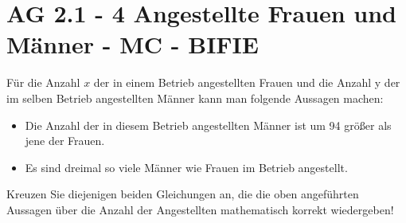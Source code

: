 \section{AG 2.1 - 4 Angestellte Frauen und Männer - MC - BIFIE}

\begin{beispiel}[AG 2.1]{1} %
Für die Anzahl $x$ der in einem Betrieb angestellten Frauen und die Anzahl y der im selben Betrieb angestellten Männer kann man folgende Aussagen machen:
\begin{itemize}
	\item Die Anzahl der in diesem Betrieb angestellten Männer ist um 94 größer als jene der Frauen.
	\item Es sind dreimal so viele Männer wie Frauen im Betrieb angestellt.
\end{itemize}
	
	\leer
Kreuzen Sie diejenigen beiden Gleichungen an, die die oben angeführten Aussagen über die Anzahl der Angestellten mathematisch korrekt wiedergeben! 	
	
\end{beispiel}